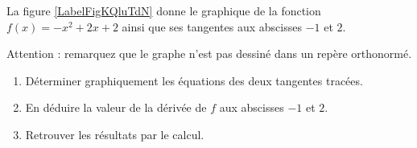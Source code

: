 
\begin{exercice}\label{exosmath-0397}

La figure \ref{LabelFigKQluTdN} donne le graphique de la fonction \( f(x)=-x^2+2x+2\) ainsi que ses tangentes aux abscisses \( -1\) et \( 2\).
\newcommand{\CaptionFigKQluTdN}{Le graphe de la fonction \( f(x)=-x^2+2x+2\) pour l'exercice \ref{exosmath-0397}.}


Attention : remarquez que le graphe n'est pas dessiné dans un repère orthonormé.

\begin{enumerate}
    \item
        Déterminer graphiquement les équations des deux tangentes tracées.
    \item
        En déduire la valeur de la dérivée de \( f\) aux abscisses \( -1\) et \( 2\).
    \item
        Retrouver les résultats par le calcul.
\end{enumerate}

\end{exercice}
